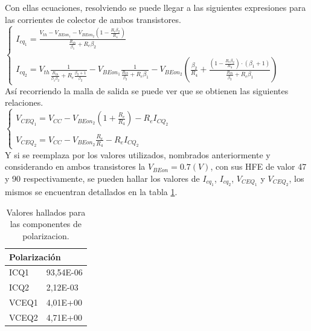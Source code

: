 Con ellas ecuaciones, resolviendo se puede llegar a las siguientes expresiones para las corrientes de colector de ambos transistores.\\

		$
		\begin{cases}
		I_{cq_{1}}=\frac{V_{th}-V_{BEon_{1}}-V_{BEon_{2}}\left(1-\frac{R_{e}\beta_{2}}{R_{4}}\right)}{\frac{R_{th}}{\beta_{1}}+R_{e}\beta_{2}}\\ \\
		I_{cq_{2}}=V_{th}\frac{1}{\frac{R_{th}}{\beta_{1}\beta_{2}}+R_{e}\frac{\beta_{2}+1}{\beta_{2}}}-V_{BEon_{1}}\frac{1}{\frac{R_{th}}{\beta_{2}}+R_{e}\beta_{1}}-V_{BEon_{2}}\left(\frac{\beta_{2}}{R_{4}}+\frac{\left(1-\frac{R_{e}\beta_{2}}{R_{4}}\right)\cdot(\beta_{1}+1)}{\frac{R_{th}}{\beta_{2}}+R_{e}\beta_{1}} \right)
		\end{cases}
		$\\

Así recorriendo la malla de salida se puede ver que se obtienen las siguientes relaciones.\\

		$
		\begin{cases}
		V_{CEQ_{1}}=V_{CC}-V_{BEon_{2}}\left(1+\frac{R_{e}}{R_{4}}\right)-R_{e}I_{CQ_{2}}\\ \\
		V_{CEQ_{2}}=V_{CC}-V_{BEon_{2}}\frac{R_{e}}{R_{4}}-R_{e}I_{CQ_{2}}
		\end{cases}
		$\\
	
Y si se reemplaza por los valores utilizados, nombrados anteriormente y considerando en ambos transistores la $V_{BEon}=0.7(V)$, con sus HFE de valor 47 y 90 respectivamente, se pueden hallar los valores de $I_{cq_{1}}$, $I_{cq_{2}}$, $V_{CEQ_{1}}$ y $V_{CEQ_{2}}$, los mismos se encuentran detallados en la tabla \ref{tabla_valores_polarizacion}.

\begin{table}[H]
\centering
\caption{Valores hallados para las componentes de polarizacion.}
\begin{tabular}{ll}
\multicolumn{2}{l}{Polarización} \\ \hline
ICQ1          & 93,54E-06        \\
ICQ2         & 2,12E-03         \\
VCEQ1         & 4,01E+00         \\
VCEQ2         & 4,71E+00        
\end{tabular}
\label{tabla_valores_polarizacion}  
\end{table}

